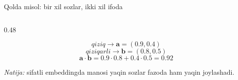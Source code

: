 \documentclass[aspectratio=169,11pt]{beamer}
\begin{document}
\begin{frame}{Qo\textquotesingle{}lda misol: bir xil so\textquotesingle{}zlar, ikki xil ifoda}
\begin{columns}[T,totalwidth=\textwidth]
\begin{column}{0.48\textwidth}
\vspace{5pt}

\begin{tcolorbox}[defbox,width=\linewidth]
\[
\textit{qiziq}\rightarrow \mathbf{a}=(0.9,0.4)
\]
\[
\textit{qiziqarli}\rightarrow \mathbf{b}=(0.8,0.5)
\]
\[
\mathbf{a}\cdot\mathbf{b}
=0.9\cdot0.8+0.4\cdot0.5=0.92
\]
\end{tcolorbox}

\vspace{2pt}
\textit{Natija:} sifatli embeddingda ma\textquotesingle{}nosi yaqin
so\textquotesingle{}zlar fazoda ham yaqin joylashadi.
\end{column}
\end{columns}

\end{frame}
\end{document}
